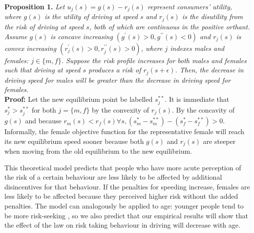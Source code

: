 \textbf{Proposition 1.} {\it 
Let $u_j (s) = g(s) - r_j (s)$ represent consumers' utility, 
where $g(s)$ is the utility of driving at speed $s$ 
and $r_j (s)$ is the disutility from the risk of driving at speed $s$, 
both of which are continuous in the positive orthant. 
%
Assume $g(s)$ is concave increasing $(g^{\prime} (s)>0, 
g^{\prime\prime} (s)<0)$ 
and $r_j (s)$ is convex increasing $(r_j^{\prime} (s)>0, r_j^{\prime\prime} (s)>0)$, 
where $j$ indexes males and females: $j \in \{m,f\}$. 
%
Suppose the risk profile increases 
for both males and females such that driving at speed $s$ 
produces a risk of $r_j (s+\epsilon)$. 
%
Then, the decrease in driving speed for males will be greater 
than the decrease in driving speed for females.} \\

\textbf{Proof:} Let the new equilibrium point be labelled $s_j^{**}$. 
It is immediate that $s_j^*>s_j^{**}$ 
for both $j=\{m,f\}$ by the convexity of $r_j (s)$. 
By the concavity of $g(s)$ 
and because 
$r_m (s)<r_f (s)  \forall s, 
(s_m^*-s_m^{**} ) - (s_f^*-s_f^{**})>0$. \qedsymbol \\



Informally, the female objective function for the representative female 
will reach its new equilibrium speed sooner 
because both $g(s)$ and $r_j (s)$ are steeper 
when moving from the old equilibrium to the new equilibrium.

This theoretical model predicts that people who 
have more acute perception of the risk of
% 
a certain behaviour are less likely to be affected 
by additional disincentives for that behaviour. 
If the penalties for speeding increase, 
females are less likely to be affected because 
they perceived higher risk without the added penalties.  
The model can analogously be applied to age: 
younger people tend to be more risk-seeking 
\citep[e.g.][]{gongyang2012}, 
so we also predict that our empirical results will show that the effect of the law 
on risk taking behaviour in driving will decrease with age.



